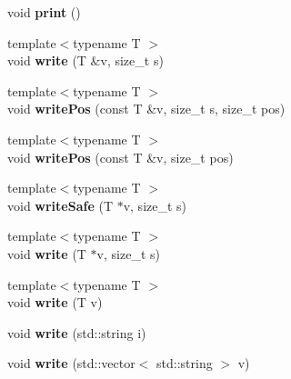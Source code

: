 \begin{DoxyCompactItemize}
void {\bfseries print} ()
\item 
\hypertarget{classfaster_1_1fastCommBuffer_a3b38d4b6332e864c9f7285961207a8dc}{}\label{classfaster_1_1fastCommBuffer_a3b38d4b6332e864c9f7285961207a8dc} 
{\footnotesize template$<$typename T $>$ }\\void {\bfseries write} (T \&v, size\+\_\+t s)
\item 
\hypertarget{classfaster_1_1fastCommBuffer_a4dc3d8c99ff08b1314fc36c77905dcbf}{}\label{classfaster_1_1fastCommBuffer_a4dc3d8c99ff08b1314fc36c77905dcbf} 
{\footnotesize template$<$typename T $>$ }\\void {\bfseries write\+Pos} (const T \&v, size\+\_\+t s, size\+\_\+t pos)
\item 
\hypertarget{classfaster_1_1fastCommBuffer_addda5fa378a3dfbb4ca1b14405b31c67}{}\label{classfaster_1_1fastCommBuffer_addda5fa378a3dfbb4ca1b14405b31c67} 
{\footnotesize template$<$typename T $>$ }\\void {\bfseries write\+Pos} (const T \&v, size\+\_\+t pos)
\item 
\hypertarget{classfaster_1_1fastCommBuffer_ac47c799234667ff23f5b5ddd699f2ed2}{}\label{classfaster_1_1fastCommBuffer_ac47c799234667ff23f5b5ddd699f2ed2} 
{\footnotesize template$<$typename T $>$ }\\void {\bfseries write\+Safe} (T $\ast$v, size\+\_\+t s)
\item 
\hypertarget{classfaster_1_1fastCommBuffer_a29d46f8bf3c72be5c52d27af129392c5}{}\label{classfaster_1_1fastCommBuffer_a29d46f8bf3c72be5c52d27af129392c5} 
{\footnotesize template$<$typename T $>$ }\\void {\bfseries write} (T $\ast$v, size\+\_\+t s)
\item 
\hypertarget{classfaster_1_1fastCommBuffer_ac70b22b40984e536be908ac6b57c06f1}{}\label{classfaster_1_1fastCommBuffer_ac70b22b40984e536be908ac6b57c06f1} 
{\footnotesize template$<$typename T $>$ }\\void {\bfseries write} (T v)
\item 
\hypertarget{classfaster_1_1fastCommBuffer_a5e472bea93ebc8e55a5c9312ecbd0592}{}\label{classfaster_1_1fastCommBuffer_a5e472bea93ebc8e55a5c9312ecbd0592} 
void {\bfseries write} (std\+::string i)
\item 
\hypertarget{classfaster_1_1fastCommBuffer_a12e8e45c442f4b890baff0039d8a3af7}{}\label{classfaster_1_1fastCommBuffer_a12e8e45c442f4b890baff0039d8a3af7} 
void {\bfseries write} (std\+::vector$<$ std\+::string $>$ v)
\item 
\hypertarget{classfaster_1_1fastCommBuffer_abd183153da65d51c42d69070a09da573}{}\label{classfaster_1_1fastCommBuffer_abd183153da65d51c42d69070a09da573} 

\end{DoxyCompactItemize}
